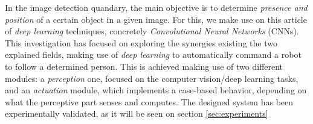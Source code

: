 In the image detection quandary, the main objective is to determine \emph{presence and position} of a certain object in a given image. For this, we make use on this article of \emph{deep learning} techniques, concretely \emph{Convolutional Neural Networks} (CNNs).\\


This investigation has focused on exploring the synergies existing the two explained fields, making use of \emph{deep learning} to automatically command a robot to follow a determined person. This is achieved making use of two different modules: a \emph{perception} one, focused on the computer vision/deep learning tasks, and an \emph{actuation} module, which implements a case-based behavior, depending on what the perceptive part senses and computes. The designed system has been experimentally validated, as it will be seen on section \ref{sec:experiments}